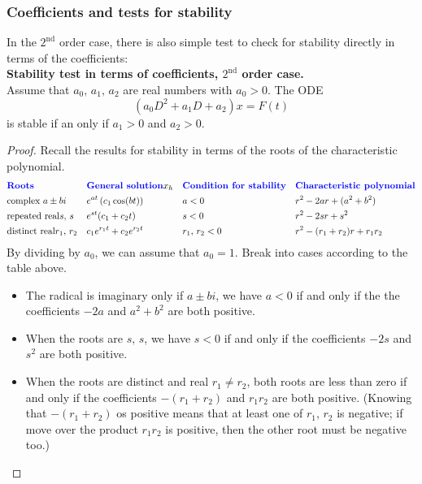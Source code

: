 \subsubsection{Coefficients and tests for stability}

In the $2^{\text {nd}}$ order case, there is also simple test to check
for stability directly in terms of the coefficients:\\

\textbf{Stability test in terms of coefficients, $2^{\text {nd}}$ order case.}\\
Assume that $a_ 0,\, a_1,\, a_2$ are real numbers with $a_ 0 > 0$.
The ODE
\begin{equation*}
  (a_0 D^2 + a_1 D + a_2) x = F(t)
\end{equation*}
is stable if an only if $a_ 1 > 0$ and $a_2 > 0$. \\
\begin{proof}
  Recall the results for stability in terms of the roots of the characteristic polynomial.
  \begin{align*}
    &\text{\textbf{\color{blue}Roots}}&
    &\text{\textbf{\color{blue}General solution}} x_ h &
    &\text{\textbf{\color{blue}Condition for stability}} &
    &\text{\textbf{\color{blue} Characteristic polynomial}}\\
    &\text{complex } a \pm bi &
    &e^{at}\left(c_ 1 \cos (bt) \right)&
    & a < 0 &
    &r^2 - 2ar + (a^2 + b^2)\\
    &\text{repeated real} s,\, s &
    &e^{st} (c_ 1 + c_ 2 t)&
    &s < 0&
    &r^2 -2sr + s^2\\
    &\text{distinct real} r_ 1,\, r_ 2 & 
    & c_ 1 e^{r_ 1 t} + c_ 2 e^{r_ 2 t} &
    &r_ 1 , \, r_ 2 < 0&
    &r^2 -(r_1 + r_2)r + r_1 r_2\\
  \end{align*}
  By dividing by $a_0$, we can assume that $a_0 = 1$.
  Break into cases according to the table above.
  \begin{itemize}
  \item The radical is imaginary only if $a \pm bi$,
    we have $a < 0$ if and only if the the coefficients $-2a$
    and $a^2 + b^2$ are both positive.
  \item When the roots are $s,\, s$,
    we have $s < 0$ if and only if the coefficients $-2s$ and $s^2$
    are both positive.
  \item When the roots are distinct and real $r_1 \neq r_2$,
    both roots are less than zero if and only if the coefficients
    $-(r_1 + r_2)$ and $r_1 r_2$ are both positive.
    (Knowing that $-(r_1 + r_2)$ os positive means that at least
    one of $r_1,\, r_2$ is negative;
    if move over the product $r_1 r_2$ is positive,
    then the other root must be negative too.)     
  \end{itemize}
\end{proof}

